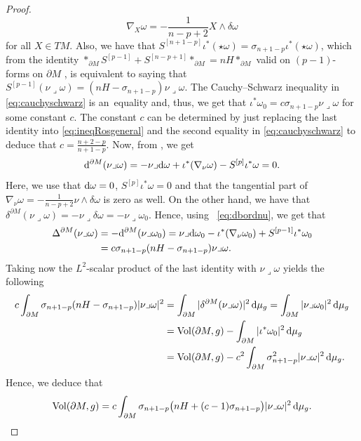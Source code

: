 \documentclass[pdftex]{sigma}
\numberwithin{equation}{section}
\begin{document}
\begin{proof}
\[
\nabla_X\omega=-\frac{1}{n-p+2}X\wedge\delta\omega
\]
for all $X\in TM$. Also, we have that $S^{[n+1-p]}\iota^*(\star\omega)=\sigma_{n+1-p}\iota^*(\star\omega)$, which from the identity $*_{\partial M}S^{[p-1]}+S^{[n-p+1]}*_{\partial M}=nH*_{\partial M}$ valid on $(p-1)$-forms on $\partial M$ \cite[p. 624]{RaulotSavo11}, is equivalent to saying that $S^{[p-1]}(\nu\lrcorner\omega)=(nH-\sigma_{n+1-p})\nu\lrcorner\omega$. The Cauchy--Schwarz i\-ne\-qua\-li\-ty in \eqref{eq:cauchyschwarz} is an~equality and, thus, we get that $\iota^*\omega_0=c \sigma_{n+1-p}\nu\lrcorner\omega$ for some constant $c$. The constant $c$ can be determined by just replacing the last identity into \eqref{eq:ineqRosgeneral} and the second equality in \eqref{eq:cauchyschwarz} to deduce that $c=\frac{n+2-p}{n+1-p}$.
Now, from \cite[Lemma 18]{RaulotSavo11}, we get
\begin{equation}\label{eq:dbordnu}
{\rm d}^{\partial M}(\nu\lrcorner\omega)=-\nu\lrcorner {\rm d}\omega+\iota^*(\nabla_\nu\omega)-S^{[p]}\iota^*\omega=0.
\end{equation}
Here, we use that ${\rm d}\omega=0$, $S^{[p]}\iota^*\omega=0$ and that the tangential part of $\nabla_\nu\omega=-\frac{1}{n-p+2}\nu\wedge\delta\omega$ is zero as well.
On the other hand, we have that $\delta^{\partial M}(\nu\lrcorner\omega)=-\nu\lrcorner\delta\omega=-\nu\lrcorner\omega_0$. Hence, using~ \eqref{eq:dbordnu}, we get that
\begin{align*}
\Delta^{\partial M}(\nu\lrcorner\omega)&= -{\rm d}^{\partial M}(\nu\lrcorner\omega_0)=\nu\lrcorner {\rm d}\omega_0-\iota^*(\nabla_\nu\omega_0)+S^{[p-1]}\iota^*\omega_0\\
&= c\sigma_{n+1-p}(nH-\sigma_{n+1-p})\nu\lrcorner\omega.
\end{align*}
Taking now the $L^2$-scalar product of the last identity with $\nu\lrcorner\omega$ yields the following
\begin{align*}
c\int_{\partial M}\sigma_{n+1-p}(nH-\sigma_{n+1-p})|\nu\lrcorner\omega|^2&= \int_{\partial M}|\delta^{\partial M}(\nu\lrcorner\omega)|^2\,{\rm d}\mu_g
=\int_{\partial M}|\nu\lrcorner\omega_0|^2\,{\rm d}\mu_g\\
&=  {\rm Vol}(\partial M,g)-\int_{\partial M}|\iota^*\omega_0|^2\,{\rm d}\mu_g\\
&= {\rm Vol}(\partial M,g)-c^2\int_{\partial M}\sigma_{n+1-p}^2|\nu\lrcorner\omega|^2\,{\rm d}\mu_g.
\end{align*}
Hence, we deduce that
\[{\rm Vol}(\partial M,g)=c\int_{\partial M}\sigma_{n+1-p}\bigl(nH+(c-1)\sigma_{n+1-p}\bigr)|\nu\lrcorner\omega|^2\,{\rm d}\mu_g.\]

\end{proof}
\end{document}
